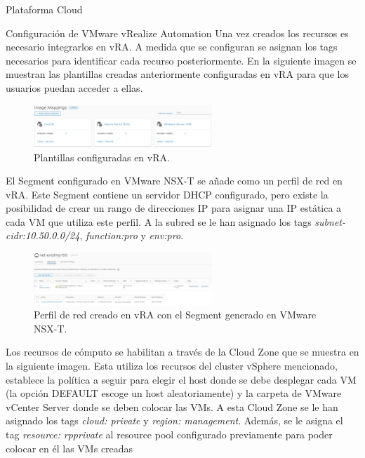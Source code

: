 \begin{subsection}{Plataforma Cloud}
    \begin{subsubsection}{Configuración de VMware vRealize Automation}
        Una vez creados los recursos es necesario integrarlos en vRA. A medida que se configuran se asignan los tags necesarios para identificar cada recurso posteriormente.
        En la siguiente imagen se muestran las plantillas creadas anteriormente configuradas en vRA para que los usuarios puedan acceder a ellas.
        \begin{figure}[h]
            \centering
            \includegraphics[width=0.6\textwidth]{imaxes/pruebaconcepto/vrealize/image-mappings.png}
            \caption{Plantillas configuradas en vRA.}
            \label{fig:image-mapping}
        \end{figure}
        \FloatBarrier
        El Segment configurado en VMware NSX-T se añade como un perfil de red en vRA. Este Segment contiene un servidor DHCP configurado, pero existe la posibilidad de crear un rango de direcciones IP para asignar una IP estática a cada VM que utiliza este perfil. A la subred se le han asignado los tags \textit{subnet-cidr:10.50.0.0/24}, \textit{function:pro} y \textit{env:pro}.
        \begin{figure}[h]
            \centering
            \includegraphics[width=0.6\textwidth]{imaxes/pruebaconcepto/vrealize/net-profile.png}
            \caption{Perfil de red creado en vRA con el Segment generado en VMware NSX-T.}
            \label{fig:net-profile}
        \end{figure}
        \FloatBarrier
        Los recursos de cómputo se habilitan a través de la Cloud Zone que se muestra en la siguiente imagen. Esta utiliza los recursos del cluster vSphere mencionado, establece la política a seguir para elegir el host donde se debe desplegar cada VM (la opción DEFAULT escoge un host aleatoriamente) y la carpeta de VMware vCenter Server donde se deben colocar las VMs. A esta Cloud Zone se le han asignado los tags \textit{cloud: private} y \textit{region: management}. Además, se le asigna el tag \textit{resource: rpprivate} al resource pool configurado previamente para poder colocar en él las VMs creadas

\end{subsubsection}
\end{subsection}
